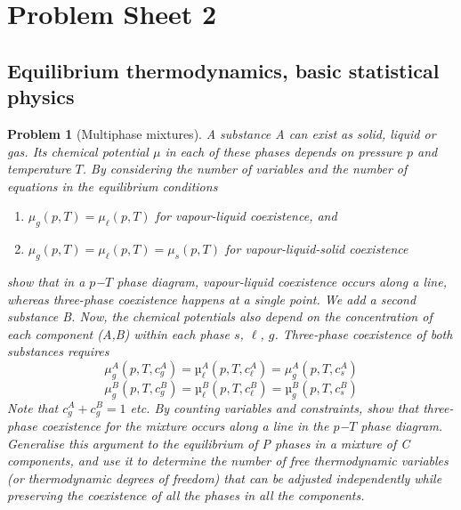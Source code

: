 \documentclass[a4paper]{article}
\theoremstyle{new2}
\theoremstyle{new}
\newtheorem{qns}{Problem}[section]
\begin{document}
\section{Problem Sheet 2}
\subsection*{Equilibrium thermodynamics, basic statistical physics}
\begin{qns}[Multiphase mixtures]
A substance A can exist as solid, liquid or gas. Its chemical potential $\mu$ in each of these phases depends on pressure $p$ and temperature $T$. By considering the number of variables and the number of equations in the equilibrium conditions
\begin{enumerate}[label=\roman*]
\item $\mu_g(p,T)=\mu_\ell(p,T)$ for vapour-liquid coexistence, and
\item $\mu_g(p,T)=\mu_\ell(p,T)=\mu_s(p,T)$ for vapour-liquid-solid coexistence
\end{enumerate}
show that in a $p$−$T$ phase diagram, vapour-liquid coexistence occurs along a line, whereas three-phase coexistence happens at a single point. We add a second substance B. Now, the chemical potentials also depend on the concentration of each component (A,B) within each phase $s$, $\ell$, $g$. Three-phase coexistence of both substances requires
$$\mu^A_g (p,T,c^A_g ) = µ^A_\ell (p,T,c^A_\ell ) = \mu^A_g (p,T,c^A_s )$$
$$\mu^B_g (p,T,c^B_g ) = µ^B_\ell (p,T,c^B_\ell ) = µ^B_g (p,T,c^B_s)$$
Note that $c^A_g + c^B_g = 1$ etc. By counting variables and constraints, show that three-phase coexistence for the mixture occurs along a line in the $p$−$T$ phase diagram.\\[5pt]
Generalise this argument to the equilibrium of P phases in a mixture of C components, and use it to determine the number of free thermodynamic variables (or thermodynamic degrees of freedom) that can be adjusted independently while preserving the coexistence of all the phases in all the components.
\end{qns}
\end{document}
